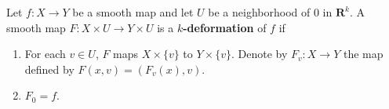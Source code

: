 Let $f: X \to Y$ be a smooth map and let $U$ be a neighborhood of $0$ in $\mathbf{R}^k$. A smooth map $F: X \times U \to Y \times U$ is a \textbf{$k$-deformation} of $f$ if

\begin{enumerate}
  \item[(i)] For each $v \in U$, $F$ maps $X \times \{v\}$ to $Y \times \{v\}$. Denote by $F_v: X \to Y$ the map defined by $F(x, v) = (F_v(x), v)$.
  \item[(ii)] $F_0 = f$.
\end{enumerate}
